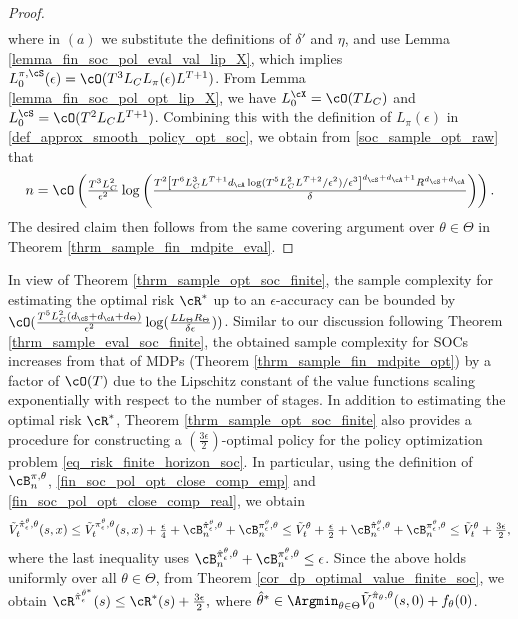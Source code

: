 \documentclass[9pt]{article}
\numberwithin{equation}{section}
\renewcommand{\frac}[2]{\tfrac{#1}{#2}}
\begin{document}
\begin{proof}
\begin{align}
    \end{align}
    where in $(a)$ we substitute the definitions of $\delta'$ and $\eta$, and use Lemma \ref{lemma_fin_soc_pol_eval_val_lip_X}, which implies $L_0^{\pi, \cS}(\epsilon) = \cO(T^3 L_C L_\pi(\epsilon) L^{T+1})$. 
    From  Lemma \ref{lemma_fin_soc_pol_opt_lip_X}, we have $L_0^{\cX} = \cO(T L_C)$ and $L_0^{\cS} = \cO(T^2 L_C L^{T+1})$.
    Combining this with the definition of $L_\pi(\epsilon)$ in \eqref{def_approx_smooth_policy_opt_soc}, we obtain from \eqref{soc_sample_opt_raw} that 
    \begin{align}
        n = \cO \left(\tfrac{T^3 L_C^2}{\epsilon^2} \log \left(\tfrac{T^2\left[T^6 L_C^3 L^{T+1} d_\cA \log(T^5 L_C^2 L^{T+2}/\epsilon^2)/\epsilon^3\right]^{d_\cS + d_\cA + 1} R^{d_\cS + d_\cA}}{\delta}\right)\right). \nonumber
    \end{align}
    The desired claim then follows from the same covering argument over  $\theta \in \Theta$  in Theorem \ref{thrm_sample_fin_mdpite_eval}.
\end{proof}

In view of Theorem \ref{thrm_sample_opt_soc_finite}, the sample complexity for estimating the optimal risk $\cR^*$ up to an $\epsilon$-accuracy can be bounded by $\cO(\tfrac{T^5 L_C^2 (d_\cS + d_\cA + d_\Theta)}{\epsilon^2} \log(\tfrac{L L_\Theta R_\Theta}{\delta \epsilon}))$.
Similar to our discussion following Theorem \ref{thrm_sample_eval_soc_finite}, the obtained sample complexity for SOCs increases from that of MDPs (Theorem \ref{thrm_sample_fin_mdpite_opt}) by a factor of $\cO(T)$ due to the Lipschitz constant of the value functions scaling exponentially with respect to the number of stages. 
   In addition to estimating the optimal risk $\cR^*$, Theorem \ref{thrm_sample_opt_soc_finite} also provides a procedure for constructing a $(\tfrac{3\epsilon}{2})$-optimal policy for the policy optimization problem \eqref{eq_risk_finite_horizon_soc}. In particular, using the definition of $\cB_n^{\pi, \theta}$, \eqref{fin_soc_pol_opt_close_comp_emp} and \eqref{fin_soc_pol_opt_close_comp_real}, we obtain
    \begin{align*}
          \tilde{V}_t^{\hat{\pi}_\epsilon^\theta, \theta}(s,x) 
           \leq \tilde{V}_{t}^{\pi_\epsilon^\theta, \theta}(s,x) + \frac{\epsilon}{4} + \cB^{\hat{\pi}_\epsilon^\theta,\theta}_n + \cB^{\pi_\epsilon^\theta,\theta}_n
          \leq \tilde{V}^\theta_t + \frac{\epsilon}{2} + \cB^{\hat{\pi}_\epsilon^\theta,\theta}_n + \cB^{\pi_\epsilon^\theta,\theta}_n
      \leq \tilde{V}^\theta_t + \frac{3 \epsilon}{2},
    \end{align*}
    where the last inequality uses $\cB^{\hat{\pi}_\epsilon^\theta,\theta}_n + \cB^{\pi_\epsilon^\theta,\theta}_n \leq \epsilon$.
    Since the above holds
    uniformly over all $\theta \in \Theta$,
    from Theorem \ref{cor_dp_optimal_value_finite_soc}, 
    we obtain   
    $
    \cR^{\hat{\pi}_\epsilon^{\hat{\theta}^*}} (s) \leq \cR^* (s) + \frac{3\epsilon}{2},
    $
    where 
    $\hat{\theta}^* \in \Argmin_{\theta \in \Theta} \tilde{V}_0^{\hat{\pi}_\theta, \theta}(s,0) + f_\theta(0)$.
\end{document}
